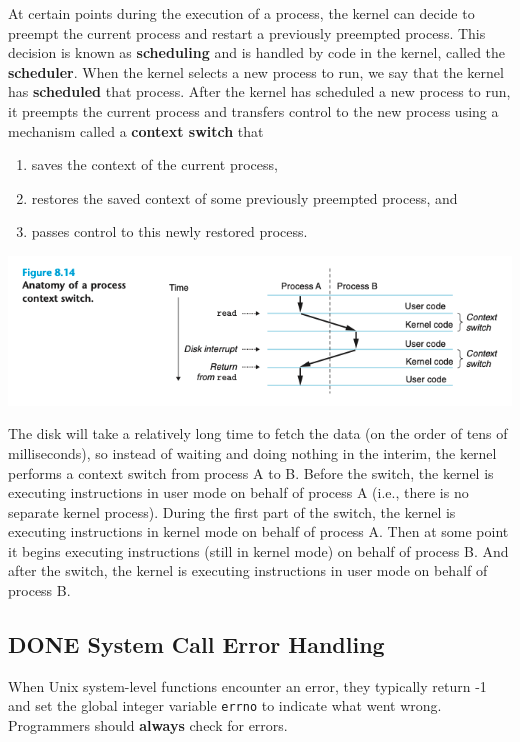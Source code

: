 \documentclass[11pt]{article}
\begin{document}
At certain points during the execution of a process, the kernel can decide to preempt the current process and restart a previously preempted process. This decision is known as \textbf{scheduling} and is handled by code in the kernel, called the \textbf{scheduler}. When the kernel selects a new process to run, we say that the kernel has \textbf{scheduled} that process. After the kernel has scheduled a new process to run, it preempts the current process and transfers control to the new process using a mechanism called a \textbf{context switch} that\\
\begin{enumerate}
\item saves the context of the current process,\\
\item restores the saved context of some previously preempted process, and\\
\item passes control to this newly restored process.\\
\end{enumerate}


\begin{center}
\includegraphics[width=.9\linewidth]{pics/figure8.14-context-switch.png}
\end{center}

The disk will take a relatively long time to fetch the data (on the order of tens of milliseconds), so instead of waiting and doing nothing in the interim, the kernel performs a context switch from process A to B. Before the switch, the kernel is executing instructions in user mode on behalf of process A (i.e., there is no separate kernel process). During the first part of the switch, the kernel is executing instructions in kernel mode on behalf of process A. Then at some point it begins executing instructions (still in kernel mode) on behalf of process B. And after the switch, the kernel is executing instructions in user mode on behalf of process B.\\


\subsection{{\bfseries\sffamily DONE} System Call Error Handling}
\label{sec:orgdfab580}
When Unix system-level functions encounter an error, they typically return -1 and set the global integer variable \texttt{errno} to indicate what went wrong. Programmers should \textbf{always} check for errors.\\
\end{document}
